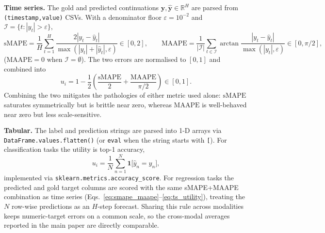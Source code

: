 \textbf{Time series.}
The gold and predicted continuations $\mathbf{y},\hat{\mathbf{y}}\in\mathbb{R}^{H}$ are parsed from \texttt{(timestamp,value)} CSVs. With a denominator floor $\varepsilon{=}10^{-2}$ and $\mathcal{I}{=}\{t:|y_t|{>}\varepsilon\}$,
\begin{equation}
\mathrm{sMAPE} = \frac{1}{H}\sum_{t=1}^{H} \frac{2|y_t-\hat{y}_t|}{\max(|y_t|+|\hat{y}_t|,\varepsilon)} \in [0,2], \qquad
\mathrm{MAAPE} = \frac{1}{|\mathcal{I}|}\sum_{t\in\mathcal{I}} \arctan\!\frac{|y_t-\hat{y}_t|}{\max(|y_t|,\varepsilon)} \in [0,\pi/2],
\label{eq:smape_maape}
\end{equation}
($\mathrm{MAAPE}{=}0$ when $\mathcal{I}{=}\emptyset$). The two errors are normalised to $[0,1]$ and combined into
\begin{equation}
u_i = 1 - \frac{1}{2}\!\left(\frac{\mathrm{sMAPE}}{2} + \frac{\mathrm{MAAPE}}{\pi/2}\right) \in [0,1].
\label{eq:ts_utility}
\end{equation}
Combining the two mitigates the pathologies of either metric used alone: $\mathrm{sMAPE}$ saturates symmetrically but is brittle near zero, whereas $\mathrm{MAAPE}$ is well-behaved near zero but less scale-sensitive.

\textbf{Tabular.}
The label and prediction strings are parsed into 1-D arrays via \texttt{DataFrame.values.flatten()} (or \texttt{eval} when the string starts with \texttt{[}). For classification tasks the utility is top-1 accuracy,
\begin{equation}
u_i = \frac{1}{N}\sum_{n=1}^{N} \mathbf{1}\!\bigl[\hat{y}_n = y_n\bigr],
\label{eq:tab_cls}
\end{equation}
implemented via \texttt{sklearn.metrics.accuracy\_score}. For regression tasks the predicted and gold target columns are scored with the same sMAPE+MAAPE combination as time series (Eqs.~\eqref{eq:smape_maape}--\eqref{eq:ts_utility}), treating the $N$ row-wise predictions as an $H$-step forecast. Sharing this rule across modalities keeps numeric-target errors on a common scale, so the cross-modal averages reported in the main paper are directly comparable.